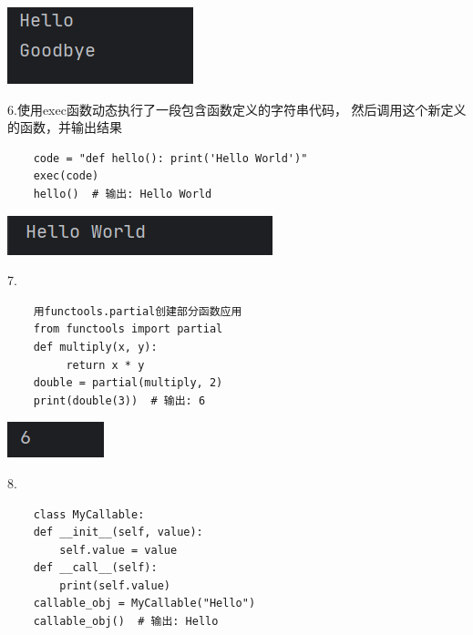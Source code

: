 \documentclass{article}
\begin{document}
\noindent
\begin{minipage}{\linewidth}
 \centering
  \includegraphics[width=0.5\linewidth]{学习13.png}
  \label{fig:example}
\end{minipage}



6.使用exec函数动态执行了一段包含函数定义的字符串代码，
然后调用这个新定义的函数，并输出结果

\begin{verbatim}
    code = "def hello(): print('Hello World')"
    exec(code)
    hello()  # 输出: Hello World
\end{verbatim}


\noindent
\begin{minipage}{\linewidth}
 \centering
  \includegraphics[width=0.5\linewidth]{学习14.png}
  \label{fig:example}
\end{minipage}

7.\begin{verbatim}
    用functools.partial创建部分函数应用
    from functools import partial
    def multiply(x, y):
         return x * y
    double = partial(multiply, 2)
    print(double(3))  # 输出: 6
  \end{verbatim}

\noindent
\begin{minipage}{\linewidth}
 \centering
  \includegraphics[width=0.5\linewidth]{学习15.png}
  \label{fig:example}
\end{minipage}

8.
\begin{verbatim}
    class MyCallable:
    def __init__(self, value):
        self.value = value
    def __call__(self):
        print(self.value)
    callable_obj = MyCallable("Hello")
    callable_obj()  # 输出: Hello
\end{verbatim}
\end{document}

